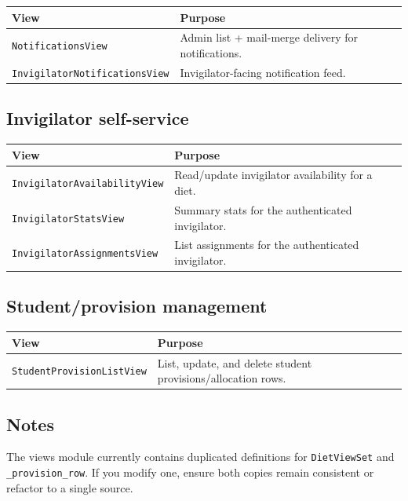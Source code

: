 \begin{longtable}{p{}p{}}
\toprule
\textbf{View} & \textbf{Purpose} \\
\midrule
\texttt{NotificationsView} & Admin list + mail-merge delivery for notifications. \\
\texttt{InvigilatorNotificationsView} & Invigilator-facing notification feed. \\
\bottomrule
\end{longtable}

\subsection{Invigilator self-service}
\label{subsec:api:views:invigilator}

\begin{longtable}{p{}p{}}
\toprule
\textbf{View} & \textbf{Purpose} \\
\midrule
\texttt{InvigilatorAvailabilityView} & Read/update invigilator availability for a diet. \\
\texttt{InvigilatorStatsView} & Summary stats for the authenticated invigilator. \\
\texttt{InvigilatorAssignmentsView} & List assignments for the authenticated invigilator. \\
\bottomrule
\end{longtable}

\subsection{Student/provision management}
\label{subsec:api:views:students}

\begin{longtable}{p{}p{}}
\toprule
\textbf{View} & \textbf{Purpose} \\
\midrule
\texttt{StudentProvisionListView} & List, update, and delete student provisions/allocation rows. \\
\bottomrule
\end{longtable}

\subsection{Notes}
\label{subsec:api:views:notes}

The views module currently contains duplicated definitions for \texttt{DietViewSet} and \texttt{\_provision\_row}. If you modify one, ensure both copies remain consistent or refactor to a single source.
